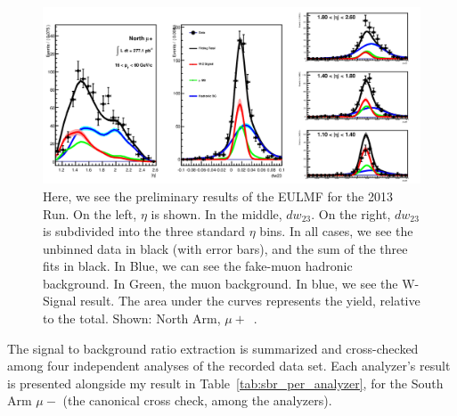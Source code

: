 \begin{figure}[ht]
  \centering
  \includegraphics[width=\linewidth]{./figures/prelim_full_maxlikefit_a1q1.jpg}
  \caption{
    Here, we see the preliminary results of the EULMF for the 2013 Run. On the
    left, $\eta$ is shown. In the middle, $dw_{23}$. On the right, $dw_{23}$ is
    subdivided into the three standard $\eta$ bins. In all cases, we see the
    unbinned data in black (with error bars), and the sum of the three fits in
    black. In Blue, we can see the fake-muon hadronic background. In Green, the
    muon background. In blue, we see the W-Signal result. The area under the
    curves represents the yield, relative to the total. Shown: North Arm,
    $\mu+$~\cite{Seidl2014a}.
  }
  \label{fig:maxlikefit_a1q1}
\end{figure}

The signal to background ratio extraction is summarized and cross-checked among
four independent analyses of the recorded data set. Each analyzer's result is
presented alongside my result in Table~\ref{tab:sbr_per_analyzer}, for the South
Arm $\mu-$ (the canonical cross check, among the analyzers).

\clearpage

